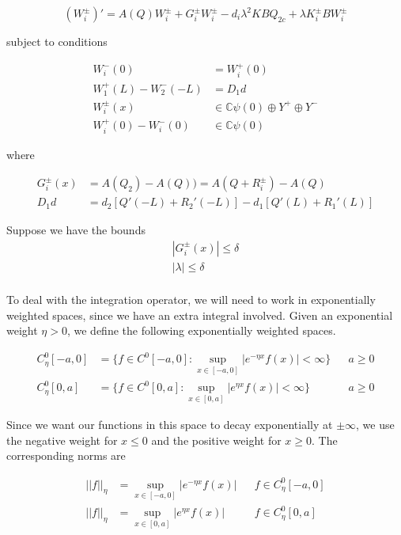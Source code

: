 \documentclass[12pt]{article}
\def\C{{\mathbb C}}
\begin{document}
\begin{equation}\label{inteigQ2}
(W_i^\pm)' = A(Q)W_i^\pm + G_i^\pm W_i^\pm - d_i \lambda^2 K B Q_{2c} + \lambda K_i^\pm BW_i^\pm 
\end{equation}

subject to conditions

\begin{align*}
W_i^-(0) &= W_i^+(0) \\
W_1^+(L) - W_2^-(-L) &= D_1 d \\
W_i^\pm(x) &\in \C \psi(0) \oplus Y^+ \oplus Y^- \\
W_i^+(0) - W_i^-(0) &\in \C \psi(0) 
\end{align*}

where

\begin{align*}
G_i^\pm(x) &= A(Q_2) - A(Q)) = A(Q + R_i^\pm) - A(Q) \\
D_1 d &= d_2 [ Q'(-L) + R_2'(-L)] - d_1 [ Q'(L) + R_1'(L) ]
\end{align*}

Suppose we have the bounds
\begin{align*}
|G_i^\pm(x)| \leq \delta \\
|\lambda| \leq \delta \\
\end{align*}

To deal with the integration operator, we will need to work in exponentially weighted spaces, since we have an extra integral involved. Given an exponential weight $\eta > 0$, we define the following exponentially weighted spaces.

\begin{align*}
C^0_\eta[-a, 0] &= \{ f \in C^0[-a, 0] : \sup_{x \in [-a, 0]} |e^{-\eta x} f(x) | < \infty \} && a \geq 0 \\
C^0_\eta[0, a] &= \{ f \in C^0[0, a] : \sup_{x \in [0, a]} |e^{\eta x} f(x) | < \infty \} && a \geq 0 
\end{align*}

Since we want our functions in this space to decay exponentially at $\pm \infty$, we use the negative weight for $x \leq 0$ and the positive weight for $x \geq 0$. The corresponding norms are 

\begin{align*}
|| f ||_\eta &= \sup_{x \in [-a, 0]} |e^{-\eta x} f(x) | && f \in C^0_\eta[-a, 0] \\
|| f ||_\eta &= \sup_{x \in [0, a]} |e^{\eta x} f(x) | && f \in C^0_\eta[0, a] \\
\end{align*}
\end{document}
